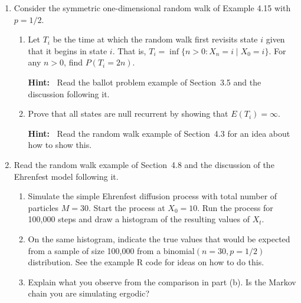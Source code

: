 \documentclass{article}
\begin{document}
\begin{enumerate}
\item Consider the symmetric one-dimensional random walk of Example 4.15 with
$p=1/2$.

  \begin{enumerate}
  
  \item Let $T_{i}$ be the time at which the random walk first revisits state
  $i$ given that it begins in state $i$. That is, $T_{i} = \inf \{n>0: X_n=i
  \mid X_0=i\}$. For any $n>0$, find $P(T_i=2n)$.
   
  {\bf Hint:\ } Read the ballot problem example of Section~3.5 and the
  discussion following it.
   
  \item Prove that all states are null recurrent by showing that
  $E(T_i)=\infty$.
   
  {\bf Hint:\ } Read the random walk example of Section~4.3 for an idea about
  how to show this.

  \end{enumerate}

\item Read the random walk example of Section~4.8 and the discussion of the
Ehrenfest model following it.

  \begin{enumerate}

  \item Simulate the simple Ehrenfest diffusion process with total number of
  particles $M=30$. Start the process at $X_0=10$. Run the process for 100,000
  steps and draw a histogram of the resulting values of $X_t$.

  \item On the same histogram, indicate the true values that would be expected
  from a sample of size 100,000 from a binomial$(n=30, p=1/2)$ distribution.  See
  the example R code for ideas on how to do this.

  \item Explain what you observe from the comparison in part (b). Is the Markov
  chain you are simulating ergodic?

  \end{enumerate}


\end{enumerate}
\end{document}
